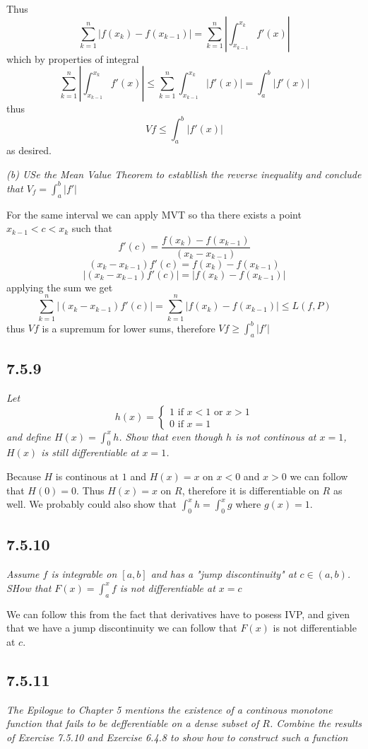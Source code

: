 \documentclass[11pt,oneside,titlepage]{book}
\begin{document}
Thus
$$\sum_{k = 1}^n{|f(x_k) - f(x_{k - 1})|} =
\sum_{k = 1}^n{\left|\int_{x_{k - 1}}^{x_k}{f'(x)}\right|}$$
which by properties of integral
$$\sum_{k = 1}^n{\left|\int_{x_{k - 1}}^{x_k}{f'(x)}\right|} \leq
\sum_{k = 1}^n{\int_{x_{k - 1}}^{x_k}{|f'(x)|}} = \int_a^b{|f'(x)|}$$
thus
$$Vf \leq \int_a^b{|f'(x)|}$$
as desired.

\textit{(b) USe the Mean Value Theorem to establlish the reverse inequality and
  conclude that $V_f = \int_a^b{|f'|}$}

For the same interval we can apply MVT so tha there exists a
point $x_{k - 1} < c < x_k$ such that
$$f'(c) = \frac{f(x_{k}) - f(x_{k - 1})}{(x_{k} - x_{k - 1})}$$
$$(x_{k} - x_{k - 1}) f'(c) = f(x_{k}) - f(x_{k - 1})$$
$$|(x_{k} - x_{k - 1}) f'(c)| = |f(x_{k}) - f(x_{k - 1})|$$
applying the sum we get
$$\sum_{k = 1}^n{|(x_{k} - x_{k - 1}) f'(c)|} =
\sum_{k = 1}^n{|f(x_{k}) - f(x_{k - 1})|} \leq L(f, P)$$
thus $V f$ is a supremum for lower sums, therefore $V f \geq \int_a^b{|f'|}$

\subsection*{7.5.9}
\textit{Let }
$$ h(x) =
\begin{cases}
  1 \text{ if } x < 1 \text{ or } x > 1 \\
  0 \text{ if } x = 1
\end{cases}
$$
\textit{and define $H(x) = \int_0^x{h}$. Show that even though $h$ is not
  continous at $x = 1$, $H(x)$ is still differentiable at $x = 1$.}

Because $H$ is continous at $1$ and $H(x) = x$ on $x < 0$ and $x > 0$ we
can follow that $H(0) = 0$. Thus $H(x) = x$ on $R$, therefore it is
differentiable on $R$ as well.
We probably could also show that $\int_0^x{h} = \int_0^x{g}$
where $g(x) = 1$. 

\subsection*{7.5.10}
\textit{Assume $f$ is integrable on $[a, b]$ and has a "jump discontinuity"
  at $c \in (a, b)$. SHow that $F(x) = \int_a^x{f}$ is not differentiable at
  $x = c$}

We can follow this from the fact that derivatives have to posess IVP, and
given that we have a jump discontinuity we can follow that $F(x)$ is not
differentiable at $c$.

\subsection*{7.5.11}
\textit{The Epilogue to Chapter 5 mentions the existence of a continous
  monotone function that fails to be defferentiable on a dense subset of
  $R$. Combine the results of Exercise 7.5.10 and Exercise 6.4.8 to show how to
  construct such a function}
\end{document}
